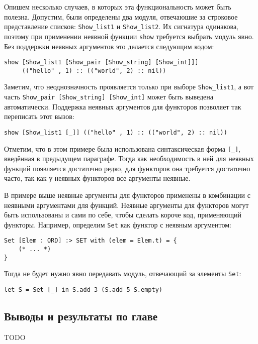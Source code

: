 \documentclass[../diploma.tex]{subfiles}
\begin{document}
Опишем несколько случаев, в которых эта функциональность может быть полезна. Допустим, были определены два модуля, отвечаюшие за строковое представление списков: \texttt{Show_list1} и \texttt{Show_list2}. Их сигнатура одинакова, поэтому при применении неявной функции \texttt{show} требуется выбрать модуль явно. Без поддержки неявных аргументов это делается следующим кодом:

\begin{verbatim}
show [Show_list1 [Show_pair [Show_string] [Show_int]]]
     (("hello" , 1) :: (("world", 2) :: nil))
\end{verbatim}

Заметим, что неоднозначность проявляется только при выборе \texttt{Show_list1}, а вот часть \texttt{Show_pair [Show_string] [Show_int]} может быть выведена автоматически. Поддержка неявных аргументов для функторов позволяет так переписать этот вызов:

\begin{verbatim}
show [Show_list1 [_]] (("hello" , 1) :: (("world", 2) :: nil))
\end{verbatim}

Отметим, что в этом примере была использована синтаксическая форма \texttt{[_]}, введённая в предыдущем параграфе. Тогда как необходимость в ней для неявных функций появляется достаточно редко, для функторов она требуется достаточно часто, так как у неявных функторов все аргументы неявные.

В примере выше неявные аргументы для функторов применены в комбинации с неявными аргументами для функций. Неявные аргументы для функторов могут быть использованы и сами по себе, чтобы сделать короче код, применяющий функторы. Например, определим \texttt{Set} как функтор с неявным аргументом:

\begin{verbatim}
Set [Elem : ORD] :> SET with (elem = Elem.t) = {
    (* ... *)
}
\end{verbatim}

Тогда не будет нужно явно передавать модуль, отвечающий за элементы \texttt{Set}:

\begin{verbatim}
let S = Set [_] in S.add 3 (S.add 5 S.empty)
\end{verbatim}

\subsection{Выводы и результаты по главе}

TODO
\end{document}
